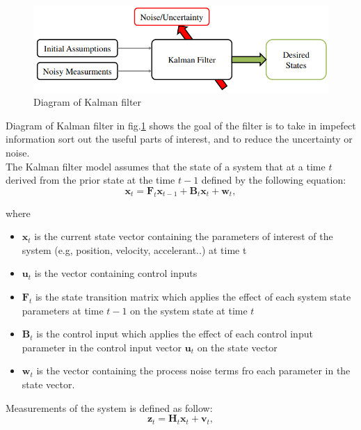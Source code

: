 \begin{figure}[h!]
        \centering
        \includegraphics[width=\textwidth]{Chapters/Fig/kalman_dig.png}
        \caption{Diagram of Kalman filter}
        \label{fig:kalman_dig}
\end{figure}\par
Diagram of Kalman filter in fig.\ref{fig:kalman_dig} shows the goal of the filter is to take in impefect information sort out the useful parts of interest, and to reduce the uncertainty or noise.\\
The Kalman filter model assumes that the state of a system that at a time $t$ derived from the prior state at the time $t-1$ defined by the following equation:
\begin{equation}
 \textbf{x}_t = \textbf{F}_t \textbf{x}_{t-1} + \textbf{B}_t \textbf{x}_t + \textbf{w}_t,
\end{equation}\par
where
\begin{itemize}
    \item $\textbf{x}_t$ is the current state vector containing the parameters of interest of the system (e.g, position, velocity, accelerant..) at time t
    \item $\textbf{u}_t$ is the vector containing control inputs
    \item $\textbf{F}_t$ is the state transition matrix which applies the effect of each system state parameters at time $t-1$ on the system state at time $t$
    \item $\textbf{B}_t$ is the control input which applies the effect of each control input parameter in the control input vector $\textbf{u}_t$ on the state vector
    \item $\textbf{w}_t$ is the vector containing the process noise terms fro each parameter in the state vector.
\end{itemize}
\pagebreak
\hspace{0.5cm}Measurements of the system is defined as follow:
\begin{equation}
         \textbf{z}_t = \textbf{H}_t\textbf{x}_t + \textbf{v}_t,
\end{equation}

